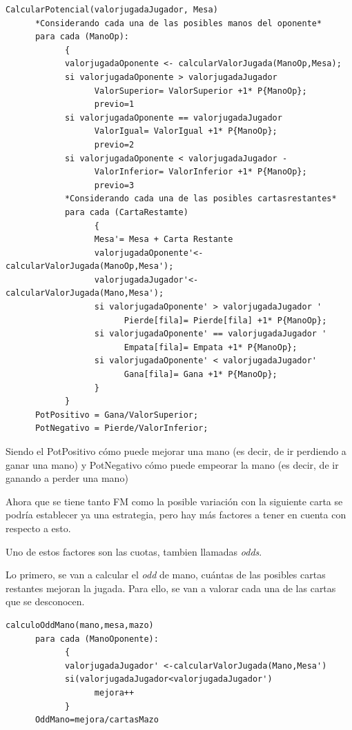 \begin{verbatim}
CalcularPotencial(valorjugadaJugador, Mesa)
      *Considerando cada una de las posibles manos del oponente*
      para cada (ManoOp):
            {
            valorjugadaOponente <- calcularValorJugada(ManoOp,Mesa);
            si valorjugadaOponente > valorjugadaJugador 
                  ValorSuperior= ValorSuperior +1* P{ManoOp};
                  previo=1
            si valorjugadaOponente == valorjugadaJugador 
                  ValorIgual= ValorIgual +1* P{ManoOp};
                  previo=2
            si valorjugadaOponente < valorjugadaJugador -
                  ValorInferior= ValorInferior +1* P{ManoOp};	
                  previo=3
            *Considerando cada una de las posibles cartasrestantes*
            para cada (CartaRestamte)
                  {
                  Mesa'= Mesa + Carta Restante
                  valorjugadaOponente'<-calcularValorJugada(ManoOp,Mesa');
                  valorjugadaJugador'<-calcularValorJugada(Mano,Mesa');
                  si valorjugadaOponente' > valorjugadaJugador '
                        Pierde[fila]= Pierde[fila] +1* P{ManoOp};
                  si valorjugadaOponente' == valorjugadaJugador '
                        Empata[fila]= Empata +1* P{ManoOp};
                  si valorjugadaOponente' < valorjugadaJugador'
                        Gana[fila]= Gana +1* P{ManoOp};	
                  }
            }
      PotPositivo = Gana/ValorSuperior;
      PotNegativo = Pierde/ValorInferior;
\end{verbatim}

Siendo el  PotPositivo cómo puede mejorar una mano (es decir, de ir perdiendo a ganar una mano) y PotNegativo cómo puede empeorar la mano (es decir, de ir ganando a perder una mano)

Ahora que se tiene tanto FM como la posible variación con la siguiente carta se podría establecer ya una estrategia, pero hay más factores a tener en cuenta con respecto a esto.

Uno de estos factores son las cuotas, tambien llamadas \textit{odds}.

Lo primero, se van a calcular el \textit{odd} de mano, cuántas de las posibles cartas restantes mejoran la jugada. Para ello, se van a valorar cada una de las cartas que se desconocen. 

\begin{verbatim}
calculoOddMano(mano,mesa,mazo)
      para cada (ManoOponente):
            {
            valorjugadaJugador' <-calcularValorJugada(Mano,Mesa')
            si(valorjugadaJugador<valorjugadaJugador')
                  mejora++
            }
      OddMano=mejora/cartasMazo
\end{verbatim}

